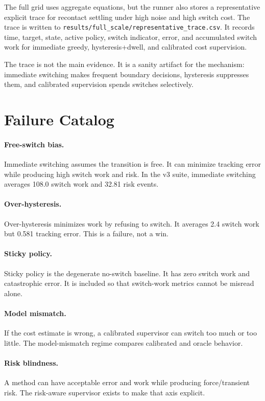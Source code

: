 \documentclass{article}
\begin{document}
The full grid uses aggregate equations, but the runner also stores a representative explicit trace for recontact settling under high noise and high switch cost.
The trace is written to \texttt{results/full\_scale/representative\_trace.csv}.
It records time, target, state, active policy, switch indicator, error, and accumulated switch work for immediate greedy, hysteresis+dwell, and calibrated cost supervision.

The trace is not the main evidence.
It is a sanity artifact for the mechanism: immediate switching makes frequent boundary decisions, hysteresis suppresses them, and calibrated supervision spends switches selectively.

\section{Failure Catalog}

\paragraph{Free-switch bias.}
Immediate switching assumes the transition is free.
It can minimize tracking error while producing high switch work and risk.
In the v3 suite, immediate switching averages 108.0 switch work and 32.81 risk events.

\paragraph{Over-hysteresis.}
Over-hysteresis minimizes work by refusing to switch.
It averages 2.4 switch work but 0.581 tracking error.
This is a failure, not a win.

\paragraph{Sticky policy.}
Sticky policy is the degenerate no-switch baseline.
It has zero switch work and catastrophic error.
It is included so that switch-work metrics cannot be misread alone.

\paragraph{Model mismatch.}
If the cost estimate is wrong, a calibrated supervisor can switch too much or too little.
The model-mismatch regime compares calibrated and oracle behavior.

\paragraph{Risk blindness.}
A method can have acceptable error and work while producing force/transient risk.
The risk-aware supervisor exists to make that axis explicit.
\end{document}
